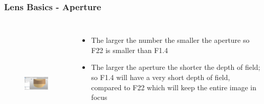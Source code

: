 \begin{frame}
\frametitle{Lens Basics - Aperture}
       \begin{columns}
             \centering
						
						\begin{figure}
							\centering
								\includegraphics[height=5cm, width=3.5cm]{img/AddingEdges.JPG}
							\label{fig:AddingEdges}
						\end{figure}
						
						\begin{itemize}
							\item The larger the number the smaller the aperture so F22 is smaller than F1.4
							\item The larger the aperture the shorter the depth of field; so F1.4 will have a very short depth of field, compared to F22 which will keep the entire image in focus
						\end{itemize}
         \end{columns} 
\end{frame}


